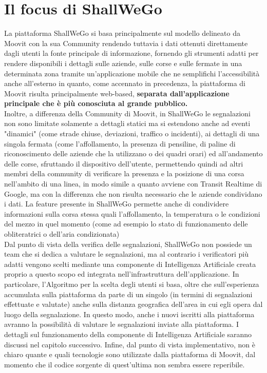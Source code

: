 \newpage
\section{Il focus di ShallWeGo}
    La piattaforma ShallWeGo si basa principalmente sul modello delineato da Moovit con la sua Community rendendo tuttavia i dati ottenuti direttamente dagli utenti la fonte principale di informazione, fornendo gli strumenti adatti per rendere disponibili i dettagli sulle aziende, sulle corse e sulle fermate in una determinata zona tramite un'applicazione mobile che ne semplifichi l'accessibilità anche all'esterno in quanto, come accennato in precedenza, la piattaforma di Moovit risulta principalmente web-based, \textbf{separata dall'applicazione principale che è più conosciuta al grande pubblico.} \\
    Inoltre, a differenza della Community di Moovit, in ShallWeGo le segnalazioni non sono limitate solamente a dettagli statici ma si estendono anche ad eventi "dinamici" (come strade chiuse, deviazioni, traffico o incidenti), ai dettagli di una singola fermata (come l'affollamento, la presenza di pensiline, di paline di riconoscimento delle aziende che la utilizzano o dei quadri orari) ed all'andamento delle corse, sfruttando il dispositivo dell'utente, permettendo quindi ad altri membri della community di verificare la presenza e la posizione di una corsa nell'ambito di una linea, in modo simile a quanto avviene con Transit Realtime di Google, ma con la differenza che non risulta necessario che le aziende condividano i dati. La feature presente in ShallWeGo permette anche di condividere informazioni sulla corsa stessa quali l'affollamento, la temperatura o le condizioni del mezzo in quel momento (come ad esempio lo stato di funzionamento delle obliteratrici o dell'aria condizionata) \\
    Dal punto di vista della verifica delle segnalazioni, ShallWeGo non possiede un team che si dedica a valutare le segnalazioni, ma al contrario i verificatori più adatti vengono scelti mediante una componente di Intelligenza Artificiale creata proprio a questo scopo ed integrata nell'infrastruttura dell'applicazione. In particolare, l'Algoritmo per la scelta degli utenti si basa, oltre che sull'esperienza accumulata sulla piattaforma da parte di un singolo (in termini di segnalazioni effettuate e valutate) anche sulla distanza geografica dell'area in cui egli opera dal luogo della segnalazione. In questo modo, anche i nuovi iscritti alla piattaforma avranno la possibilità di valutare le segnalazioni inviate alla piattaforma. I dettagli sul funzionamento della componente di Intelligenza Artificiale saranno discussi nel capitolo successivo. Infine, dal punto di vista implementativo, non è chiaro quante e quali tecnologie sono utilizzate dalla piattaforma di Moovit, dal momento che il codice sorgente di quest'ultima non sembra essere reperibile.